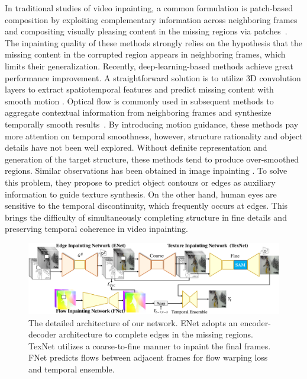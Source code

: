 In traditional studies of video inpainting, a common formulation is patch-based composition by exploiting complementary information across neighboring frames and compositing visually pleasing content in the missing regions via patches~\cite{patwardhan2007video,wexler2004space,newson2014video}.
% 
The inpainting quality of these methods strongly relies on the hypothesis that the missing content in the corrupted region appears in neighboring frames, which limits their generalization.
%
Recently, deep-learning-based methods achieve great performance improvement.
A straightforward solution is to utilize 3D convolution layers to extract spatiotemporal features and predict missing content with smooth motion \cite{wang2019video}.
Optical flow is commonly used in subsequent methods to aggregate contextual information from neighboring frames and synthesize temporally smooth results~\cite{Xu_2019_CVPR,Kim_2019_CVPR,Kim_2019_CVPR1}.
%
By introducing motion guidance, these methods pay more attention on temporal smoothness, however, structure rationality and object details have not been well explored. 
%
Without definite representation and generation of the target structure, these methods tend to produce over-smoothed regions. 
Similar observations has been obtained in image inpainting \cite{Xiong_2019_CVPR,nazeri2019edgeconnect}. %
To solve this problem, they propose to predict object contours or edges as auxiliary information to guide texture synthesis.
%
On the other hand, human eyes are sensitive to the temporal discontinuity, which frequently occurs at edges. 
This brings the difficulty of simultaneously completing structure in fine details and preserving temporal coherence in video inpainting.
 
\begin{figure}[ht]
	\centering
	\includegraphics[width=2.0\columnwidth]{sti} %
	\caption{The detailed architecture of our network. ENet adopts an encoder-decoder architecture to complete edges in the missing regions. TexNet utilizes a coarse-to-fine manner to inpaint the final frames. FNet predicts flows between adjacent frames for flow warping loss and temporal ensemble. }
	
	\label{fig:stiNet}
\end{figure}


